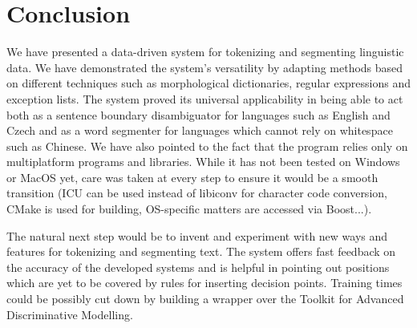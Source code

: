 \chapter*{Conclusion}

We have presented a data-driven system for tokenizing and segmenting linguistic
data. We have demonstrated the system's versatility by adapting methods based
on different techniques such as morphological dictionaries, regular expressions
and exception lists. The system proved its universal applicability in being
able to act both as a sentence boundary disambiguator for languages such as
English and Czech and as a word segmenter for languages which cannot rely on
whitespace such as Chinese. We have also pointed to the fact that the program
relies only on multiplatform programs and libraries. While it has not been
tested on Windows or MacOS yet, care was taken at every step to ensure it would
be a smooth transition (ICU can be used instead of libiconv for character code
conversion, CMake is used for building, OS-specific matters are accessed via
Boost...).

The natural next step would be to invent and experiment with new ways and
features for tokenizing and segmenting text. The system offers fast feedback on
the accuracy of the developed systems and is helpful in pointing out positions
which are yet to be covered by rules for inserting decision points. Training
times could be possibly cut down by building a wrapper over the Toolkit for
Advanced Discriminative Modelling.
